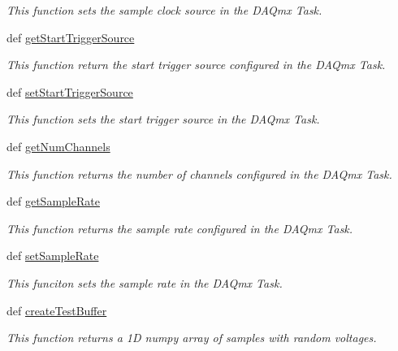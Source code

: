 \begin{DoxyCompactItemize}
\begin{DoxyCompactList}\small\item\em This function sets the sample clock source in the D\-A\-Qmx Task. \end{DoxyCompactList}\item 
def \hyperlink{class_chassis_8git_1_1_analog_output_1_1_analog_output_ae0e482ce7f377942d8aa1f0c17e25e4d}{get\-Start\-Trigger\-Source}
\begin{DoxyCompactList}\small\item\em This function return the start trigger source configured in the D\-A\-Qmx Task. \end{DoxyCompactList}\item 
def \hyperlink{class_chassis_8git_1_1_analog_output_1_1_analog_output_a0c98b6dc3f661278349fa23bfa8c7e87}{set\-Start\-Trigger\-Source}
\begin{DoxyCompactList}\small\item\em This function sets the start trigger source in the D\-A\-Qmx Task. \end{DoxyCompactList}\item 
def \hyperlink{class_chassis_8git_1_1_analog_output_1_1_analog_output_a58db66325e0a66d02e31ca78ddb7f6ee}{get\-Num\-Channels}
\begin{DoxyCompactList}\small\item\em This function returns the number of channels configured in the D\-A\-Qmx Task. \end{DoxyCompactList}\item 
def \hyperlink{class_chassis_8git_1_1_analog_output_1_1_analog_output_a40bd6b48848f454a0e86bab3d637da0a}{get\-Sample\-Rate}
\begin{DoxyCompactList}\small\item\em This function returns the sample rate configured in the D\-A\-Qmx Task. \end{DoxyCompactList}\item 
def \hyperlink{class_chassis_8git_1_1_analog_output_1_1_analog_output_a57cd627a46ed340e5c6a2b8926f6e812}{set\-Sample\-Rate}
\begin{DoxyCompactList}\small\item\em This funciton sets the sample rate in the D\-A\-Qmx Task. \end{DoxyCompactList}\item 
def \hyperlink{class_chassis_8git_1_1_analog_output_1_1_analog_output_a023ba6c2263002abdc045360bc563bbd}{create\-Test\-Buffer}
\begin{DoxyCompactList}\small\item\em This function returns a 1\-D numpy array of samples with random voltages. \end{DoxyCompactList}\item 

\end{DoxyCompactItemize}

